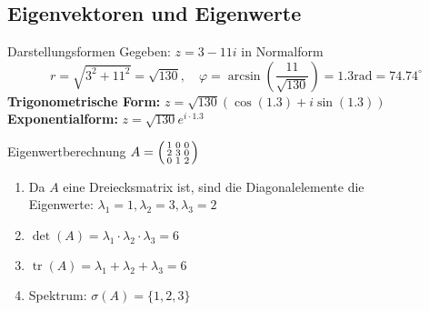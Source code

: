 \subsection{Eigenvektoren und Eigenwerte}

\begin{example2}{Darstellungsformen}
Gegeben: $z = 3 - 11i$ in Normalform
$$r = \sqrt{3^2 + 11^2} = \sqrt{130}, \quad \varphi = \arcsin(\frac{11}{\sqrt{130}}) = 1.3 \text{rad} = 74.74^{\circ}$$
\textbf{Trigonometrische Form:} $z = \sqrt{130}(\cos(1.3) + i\sin(1.3))$
\vspace{2mm}\\
\textbf{Exponentialform:} $z = \sqrt{130}e^{i\cdot 1.3}$
\end{example2}

\begin{example2}{Eigenwertberechnung}
$A = \begin{psmallmatrix} 1 & 0 & 0\\ 2 & 3 & 0\\ 0 & 1 & 2\end{psmallmatrix}$
\begin{enumerate}
    \item Da $A$ eine Dreiecksmatrix ist, sind die Diagonalelemente die \\
    Eigenwerte:
    $\lambda_1 = 1, \lambda_2 = 3, \lambda_3 = 2$
    \item $\det(A) = \lambda_1\cdot\lambda_2\cdot\lambda_3 = 6$
    \item $\operatorname{tr}(A) = \lambda_1 + \lambda_2 + \lambda_3 = 6$
    \item Spektrum: $\sigma(A) = \{1,2,3\}$
\end{enumerate}
\end{example2}

